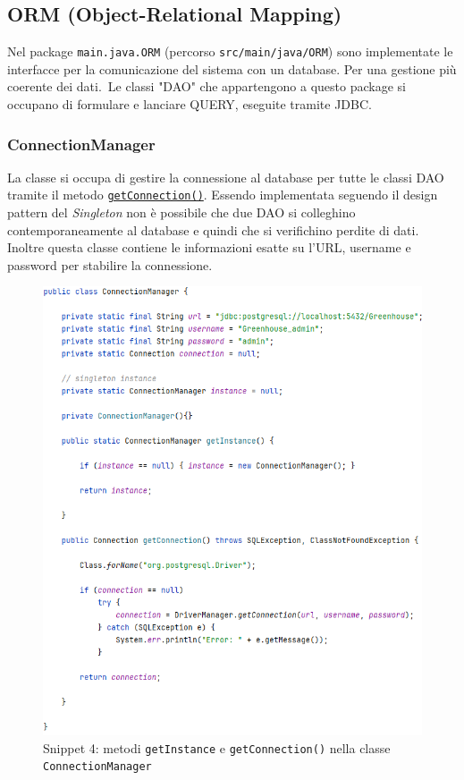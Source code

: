 \documentclass{article}
\newcommand{\code}[1]{\texttt{#1}}
\begin{document}
\subsection{ORM (Object-Relational Mapping)}
Nel package \code{main.java.ORM} (percorso \code{src/main/java/ORM}) sono implementate le interfacce per la comunicazione del sistema con un database. Per una gestione più coerente dei dati.\
Le classi "DAO" che appartengono a questo package si occupano di formulare e lanciare QUERY, eseguite tramite JDBC.

\subsubsection{ConnectionManager}
La classe si occupa di gestire la connessione al database per tutte le classi DAO tramite il metodo \hyperref[fig:snippet_connection_manager]{\code{getConnection()}}.
Essendo implementata seguendo il design pattern del \textit{Singleton} non è possibile che due DAO si colleghino contemporaneamente al database e quindi che si verifichino perdite di dati.\\
Inoltre questa classe contiene le informazioni esatte su l'URL, username e password per stabilire la connessione.

\begin{figure}[H]
    \centering
    \includegraphics[scale=0.5]{resources/images/Snippets/snippet_connection_manager.png}
    \captionsetup{labelformat=empty, labelsep=none}
    \caption{Snippet 4: metodi \code{getInstance} e \code{getConnection()} nella classe \code{ConnectionManager}}
    \label{fig:snippet_connection_manager}
\end{figure}
\end{document}

